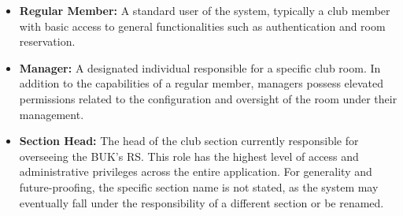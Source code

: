 \begin{itemize}
\item \textbf{Regular Member:} A standard user of the system, typically a club member with basic access to general functionalities such as authentication and room reservation.

\item \textbf{Manager:} A designated individual responsible for a specific club room. In addition to the capabilities of a regular member, managers possess elevated permissions related to the configuration and oversight of the room under their management.

\item \textbf{Section Head:} The head of the club section currently responsible for overseeing the BUK's RS. This role has the highest level of access and administrative privileges across the entire application. For generality and future-proofing, the specific section name is not stated, as the system may eventually fall under the responsibility of a different section or be renamed.
\end{itemize}

